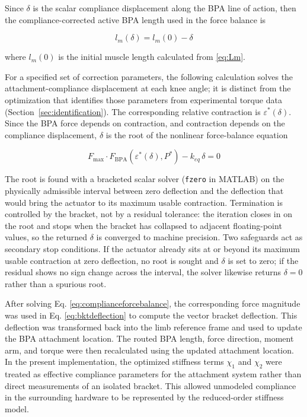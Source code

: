 Since $\delta$ is the scalar compliance displacement along the BPA line of action, then the compliance-corrected active BPA length used in the force balance is

\begin{equation} l_m(\delta) = l_m{(0)} - \delta
\label{eq:activelengthcorrected}
\end{equation}

where $l_m{(0)}$ is the initial muscle length calculated from \eqref{eq:Lm}.

For a specified set of correction parameters, the following calculation solves the attachment-compliance displacement at each knee angle; it is distinct from the optimization that identifies those parameters from experimental torque data (Section~\ref{sec:identification}). The corresponding relative contraction is $\varepsilon^*(\delta)$. Since the BPA force depends on contraction, and contraction depends on the compliance displacement, $\delta$ is the root of the nonlinear force-balance equation

\begin{equation} F_{\mathrm{max}} \cdot F_{\mathrm{BPA}}\!\left(\varepsilon^*(\delta),P^*\right) - k_{eq}\,\delta = 0
\label{eq:complianceforcebalance}
\end{equation}

The root is found with a bracketed scalar solver (\texttt{fzero} in MATLAB) on the physically admissible interval between zero deflection and the deflection that would bring the actuator to its maximum usable contraction. Termination is controlled by the bracket, not by a residual tolerance: the iteration closes in on the root and stops when the bracket has collapsed to adjacent floating-point values, so the returned $\delta$ is converged to machine precision. Two safeguards act as secondary stop conditions. If the actuator already sits at or beyond its maximum usable contraction at zero deflection, no root is sought and $\delta$ is set to zero; if the residual shows no sign change across the interval, the solver likewise returns $\delta = 0$ rather than a spurious root.

After solving Eq. \ref{eq:complianceforcebalance}, the corresponding force magnitude was used in Eq. \ref{eq:bktdeflection} to compute the vector bracket deflection. This deflection was transformed back into the limb reference frame and used to update the BPA attachment location. The routed BPA length, force direction, moment arm, and torque were then recalculated using the updated attachment location. In the present implementation, the optimized stiffness terms $\chi_{1}$ and $\chi_{2}$ were treated as effective compliance parameters for the attachment system rather than direct measurements of an isolated bracket. This allowed unmodeled compliance in the surrounding hardware to be represented by the reduced-order stiffness model.

